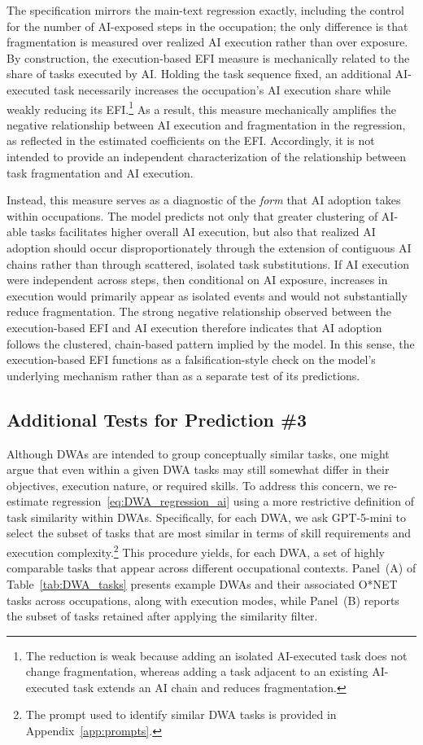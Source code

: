 The specification mirrors the main-text regression exactly, including the control for the number of AI-exposed steps in the occupation; the only difference is that fragmentation is measured over realized AI execution rather than over exposure.
By construction, the execution-based EFI measure is mechanically related to the share of tasks executed by AI.
Holding the task sequence fixed, an additional AI-executed task necessarily increases the occupation's AI execution share while weakly reducing its EFI.\footnote{The reduction is weak because adding an isolated AI-executed task does not change fragmentation, whereas adding a task adjacent to an existing AI-executed task extends an AI chain and reduces fragmentation.}
As a result, this measure mechanically amplifies the negative relationship between AI execution and fragmentation in the regression, as reflected in the estimated coefficients on the EFI.
Accordingly, it is not intended to provide an independent characterization of the relationship between task fragmentation and AI execution.

Instead, this measure serves as a diagnostic of the \emph{form} that AI adoption takes within occupations.
The model predicts not only that greater clustering of AI-able tasks facilitates higher overall AI execution, but also that realized AI adoption should occur disproportionately through the extension of contiguous AI chains rather than through scattered, isolated task substitutions.
If AI execution were independent across steps, then conditional on AI exposure, increases in execution would primarily appear as isolated events and would not substantially reduce fragmentation.
The strong negative relationship observed between the execution-based EFI and AI execution therefore indicates that AI adoption follows the clustered, chain-based pattern implied by the model.
In this sense, the execution-based EFI functions as a falsification-style check on the model's underlying mechanism rather than as a separate test of its predictions.


\subsection{Additional Tests for Prediction \#3}
\label{app:additional_robustness_pred3}
Although DWAs are intended to group conceptually similar tasks, one might argue that even within a given DWA tasks may still somewhat differ in their objectives, execution nature, or required skills.
To address this concern, we re-estimate regression~\eqref{eq:DWA_regression_ai} using a more restrictive definition of task similarity within DWAs.
Specifically, for each DWA, we ask GPT-5-mini to select the subset of tasks that are most similar in terms of skill requirements and execution complexity.\footnote{The prompt used to identify similar DWA tasks is provided in Appendix~\ref{app:prompts}.}
This procedure yields, for each DWA, a set of highly comparable tasks that appear across different occupational contexts.
Panel~(A) of Table~\ref{tab:DWA_tasks} presents example DWAs and their associated O*NET tasks across occupations, along with execution modes, while Panel~(B) reports the subset of tasks retained after applying the similarity filter.

